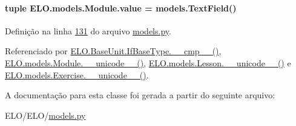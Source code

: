 \hypertarget{classELO_1_1models_1_1Module_a5b31cea93dea5474f3ff974cd745e39f}{
\paragraph[{value}]{\setlength{\rightskip}{0pt plus 5cm}tuple E\-L\-O.\-models.\-Module.\-value = models.\-Text\-Field()\hspace{0.3cm}{\ttfamily [static]}}}\label{classELO_1_1models_1_1Module_a5b31cea93dea5474f3ff974cd745e39f}


Definição na linha \hyperlink{ELO_2models_8py_source_l00131}{131} do arquivo \hyperlink{ELO_2models_8py_source}{models.\-py}.



Referenciado por \hyperlink{classELO_1_1BaseUnit_1_1IfBaseType_a69c338f6f1574bd3524e9d59ebc17a7c}{E\-L\-O.\-Base\-Unit.\-If\-Base\-Type.\-\_\-\-\_\-cmp\-\_\-\-\_\-()}, \hyperlink{classELO_1_1models_1_1Module_a1b54aa7a5e8dac090dea0926eca5550d}{E\-L\-O.\-models.\-Module.\-\_\-\-\_\-unicode\-\_\-\-\_\-()}, \hyperlink{classELO_1_1models_1_1Lesson_a3d9f0295dbe1ed5c74668d6c0876f97c}{E\-L\-O.\-models.\-Lesson.\-\_\-\-\_\-unicode\-\_\-\-\_\-()} e \hyperlink{classELO_1_1models_1_1Exercise_af3e991e5610cec815a2c3260ec6aae0b}{E\-L\-O.\-models.\-Exercise.\-\_\-\-\_\-unicode\-\_\-\-\_\-()}.



A documentação para esta classe foi gerada a partir do seguinte arquivo\-:\begin{DoxyCompactItemize}
\item 
E\-L\-O/\-E\-L\-O/\hyperlink{ELO_2models_8py}{models.\-py}\end{DoxyCompactItemize}
